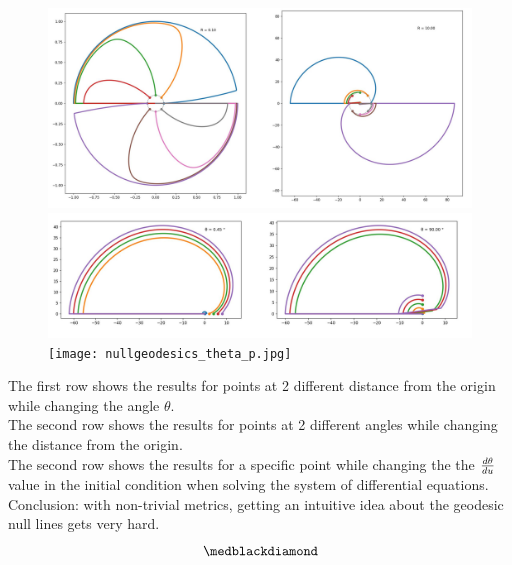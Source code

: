 \newpage
\begin{figure}[htp] 
    \centering
\includegraphics[scale=.2]{nullgeodesics_theta.jpg}
\includegraphics[scale=.25]{nullgeodesics_R.jpg}
\texttt{[image: nullgeodesics\_theta\_p.jpg]}
\end{figure}
The first row shows the results for points at 2 different distance from the origin while changing the angle $\theta$. \\
The second row shows the results for points at 2 different angles  while changing the distance from the origin. \\
The second row shows the results for  a specific point while changing the the $\dv{\theta}{u}$ value in the initial condition when solving the system of differential equations. \\
Conclusion: with non-trivial metrics, getting an intuitive idea about the geodesic null lines gets very hard.
$$\medblackdiamond$$
\newpage

